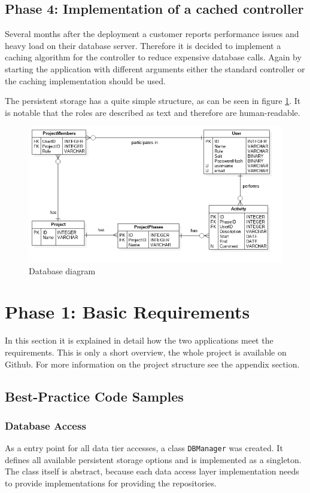 \subsection{Phase 4: Implementation of a cached controller}
Several months after the deployment a customer reports performance issues and heavy load on their database server. Therefore it is decided to implement a caching algorithm for the controller to reduce expensive database calls. Again by starting the application with different arguments either the standard controller or the caching implementation should be used.


The persistent storage has a quite simple structure, as can be seen in figure \ref{fig:database}. It is notable that the roles are described as text and therefore are human-readable. 
\begin{figure}[htbp]
\includegraphics[width=\textwidth]{./content/pictures/database.png}
\caption{Database diagram}
\label{fig:database}
\end{figure}

\clearpage

\section{Phase 1: Basic Requirements}
In this section it is explained in detail how the two applications meet the requirements. This is only a short overview, the whole project is available on Github. For more information on the project structure see the appendix section.

\subsection{Best-Practice Code Samples}

\subsubsection{Database Access}
As a entry point for all data tier accesses, a class \texttt{DBManager} was created. It defines all available persistent storage options and is implemented as a singleton. The class itself is abstract, because each data access layer implementation needs to provide implementations for providing the repositories.



